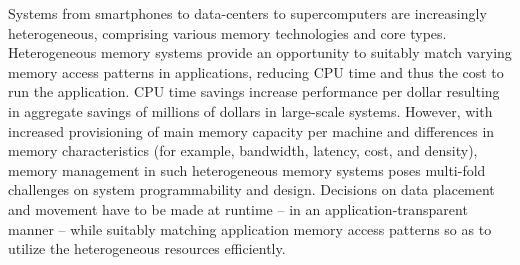 
Systems from smartphones to data-centers to supercomputers are increasingly
heterogeneous, comprising various memory technologies and core types.
Heterogeneous memory systems provide an opportunity to suitably match varying
memory access patterns in applications, reducing CPU time and thus the cost to
run the application.  CPU time savings increase performance per dollar resulting
in aggregate savings of millions of dollars in large-scale systems. However,
with increased provisioning of main memory capacity per machine and differences
in memory characteristics (for example, bandwidth, latency, cost, and density),
memory management in such heterogeneous memory systems poses multi-fold
challenges on system programmability and design. Decisions on data placement and
movement have to be made at runtime – in an application-transparent manner –
while suitably matching application memory access patterns so as to utilize the
heterogeneous resources efficiently.

